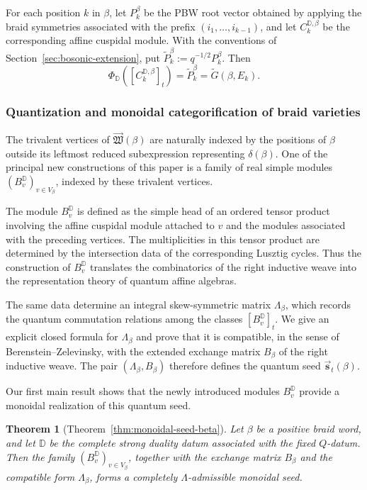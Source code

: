 \documentclass[12pt, reqno]{amsart}
\theoremstyle{plain}
\newtheorem{theorem}{Theorem}[section]
\theoremstyle{definition}
\numberwithin{equation}{section}
\newcommand{\DD}{\mathbb{D}}
\begin{document}
For each position \(k\) in \(\beta\), let \(P_k^\beta\) be the PBW
root vector obtained by applying the braid symmetries associated
with the prefix \((i_1,\ldots,i_{k-1})\), and let
\(C_k^{\DD,\beta}\) be the corresponding affine cuspidal module.
With the conventions of Section~\ref{sec:bosonic-extension}, put
\(\widetilde P_k^\beta:=q^{-1/2}P_k^\beta\). Then
\[
    \Phi_{\DD}([C_k^{\DD,\beta}]_t)
    =\widetilde P_k^\beta
    =\widetilde G(\beta,E_k).
\]

\subsubsection{Quantization and monoidal categorification of braid
varieties}

The trivalent vertices of
\(\overrightarrow{\mathfrak W}(\beta)\) are naturally indexed by
the positions of \(\beta\) outside its leftmost reduced
subexpression representing \(\delta(\beta)\). One of the principal
new constructions of this paper is a family of real simple modules
\((B_v^{\DD})_{v\in V_\beta}\), indexed by these trivalent
vertices.

The module \(B_v^{\DD}\) is defined as the simple head of an ordered
tensor product involving the affine cuspidal module attached to
\(v\) and the modules associated with the preceding vertices. The
multiplicities in this tensor product are determined by the
intersection data of the corresponding Lusztig cycles. Thus the
construction of \(B_v^{\DD}\) translates the combinatorics of the
right inductive weave into the representation theory of quantum
affine algebras.

The same data determine an integral skew-symmetric matrix
\(\Lambda_\beta\), which records the quantum commutation relations
among the classes \([B_v^{\DD}]_t\). We give an explicit closed
formula for \(\Lambda_\beta\) and prove that it is compatible, in
the sense of Berenstein--Zelevinsky, with the extended exchange
matrix \(B_\beta\) of the right inductive weave. The pair
\((\Lambda_\beta,B_\beta)\) therefore defines the quantum seed
\(\overrightarrow{\mathbf s}_t(\beta)\).

Our first main result shows that the newly introduced modules
\(B_v^{\DD}\) provide a monoidal realization of this quantum seed.

\begin{theorem}[Theorem~\ref{thm:monoidal-seed-beta}]
\label{thm:monoidal-seed}
Let \(\beta\) be a positive braid word, and let \(\DD\) be the
complete strong duality datum associated with the fixed \(Q\)-datum.
Then the family
\((B_v^{\DD})_{v\in V_\beta}\), together with the exchange matrix
\(B_\beta\) and the compatible form \(\Lambda_\beta\), forms a
completely \(\Lambda\)-admissible monoidal seed.
\end{theorem}
\end{document}
